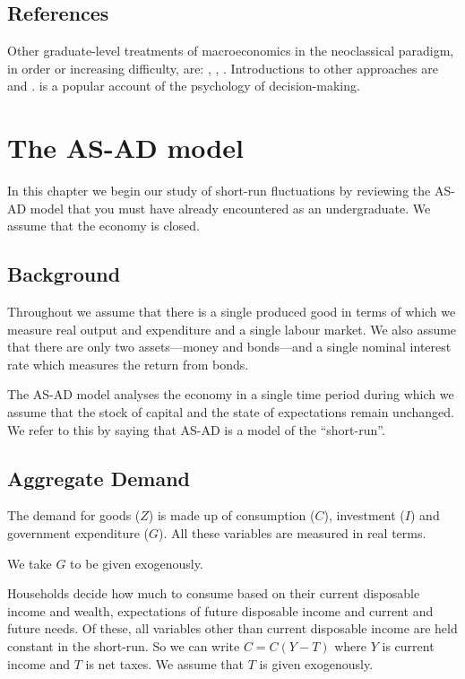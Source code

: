 \documentclass[11pt,reqno,openany]{amsbook}
\begin{document}
\section*{References}
Other graduate-level treatments of macroeconomics
in the neoclassical paradigm,
in order or increasing difficulty, are:
\cite{romer-advmacro}, \cite{ljungqvist-sargent},
\cite{slp}. Introductions to other approaches are
\cite{davidson-pkmt} and \cite{taylor-reconstruct}.
\cite{kahneman-tfs} is a
popular account of the psychology of decision-making.




\chapter{The AS-AD model}
In this chapter we begin our study of short-run fluctuations
by reviewing the AS-AD model that you must have already
encountered as an undergraduate. We assume that the economy
is closed.

\section{Background}
Throughout we assume that there is a single produced good in
terms of which we measure real output and expenditure and a
single labour market. We also assume that there are only two
assets---money and bonds---and a single nominal interest
rate which measures the return from bonds. 

The AS-AD model analyses the economy in a single time period
during which we assume that the stock of capital and the
state of expectations remain unchanged. We refer to this by
saying that AS-AD is a model of the ``short-run''.

\section{Aggregate Demand}
The demand for goods ($Z$) is made up of consumption ($C$),
investment ($I$) and government expenditure ($G$). All these
variables are measured in real terms.

We take $G$ to be given exogenously.

Households decide how much to consume based on their
current disposable income and wealth, expectations of future
disposable income and current and future needs. Of these, all
variables other than current disposable income are held
constant in the short-run. So we can write $C=C(Y-T)$ where
$Y$ is current income and $T$ is net taxes. We assume that
$T$ is given exogenously.
\end{document}
